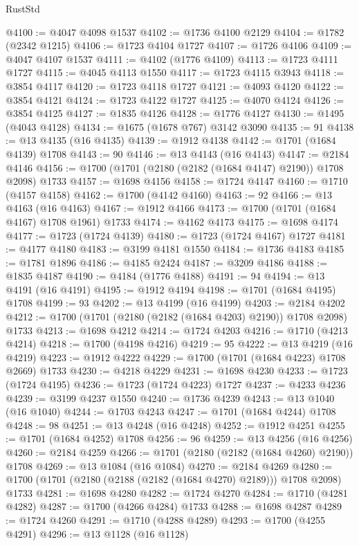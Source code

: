 \begin{lexlean}{RustStd}
\begin{coremodule}
@4100 := @4047 @4098 @1537
@4102 := @1736 @4100 @2129
@4104 := @1782 (@2342 @1215)
@4106 := @1723 @4104 @1727
@4107 := @1726 @4106
@4109 := @4047 @4107 @1537
@4111 := @4102 (@1776 @4109)
@4113 := @1723 @4111 @1727
@4115 := @4045 @4113 @1550
@4117 := @1723 @4115 @3943
@4118 := @3854 @4117
@4120 := @1723 @4118 @1727
@4121 := @4093 @4120
@4122 := @3854 @4121
@4124 := @1723 @4122 @1727
@4125 := @4070 @4124
@4126 := @3854 @4125
@4127 := @1835 @4126
@4128 := @1776 @4127
@4130 := @1495 (@4043 @4128)
@4134 := @1675 (@1678 @767) @3142 @3090
@4135 := 91
@4138 := @13 @4135 (@16 @4135)
@4139 := @1912 @4138
@4142 := @1701 (@1684 @4139) @1708
@4143 := 90
@4146 := @13 @4143 (@16 @4143)
@4147 := @2184 @4146
@4156 := @1700 (@1701 (@2180 (@2182 (@1684 @4147) @2190)) @1708 @2098) @1733
@4157 := @1698 @4156
@4158 := @1724 @4147
@4160 := @1710 (@4157 @4158)
@4162 := @1700 (@4142 @4160)
@4163 := 92
@4166 := @13 @4163 (@16 @4163)
@4167 := @1912 @4166
@4173 := @1700 (@1701 (@1684 @4167) @1708 @1961) @1733
@4174 := @4162 @4173
@4175 := @1698 @4174
@4177 := @1723 (@1724 @4139)
@4180 := @1723 (@1724 @4167) @1727
@4181 := @4177 @4180
@4183 := @3199 @4181 @1550
@4184 := @1736 @4183
@4185 := @1781 @1896
@4186 := @4185 @2424
@4187 := @3209 @4186
@4188 := @1835 @4187
@4190 := @4184 (@1776 @4188)
@4191 := 94
@4194 := @13 @4191 (@16 @4191)
@4195 := @1912 @4194
@4198 := @1701 (@1684 @4195) @1708
@4199 := 93
@4202 := @13 @4199 (@16 @4199)
@4203 := @2184 @4202
@4212 := @1700 (@1701 (@2180 (@2182 (@1684 @4203) @2190)) @1708 @2098) @1733
@4213 := @1698 @4212
@4214 := @1724 @4203
@4216 := @1710 (@4213 @4214)
@4218 := @1700 (@4198 @4216)
@4219 := 95
@4222 := @13 @4219 (@16 @4219)
@4223 := @1912 @4222
@4229 := @1700 (@1701 (@1684 @4223) @1708 @2669) @1733
@4230 := @4218 @4229
@4231 := @1698 @4230
@4233 := @1723 (@1724 @4195)
@4236 := @1723 (@1724 @4223) @1727
@4237 := @4233 @4236
@4239 := @3199 @4237 @1550
@4240 := @1736 @4239
@4243 := @13 @1040 (@16 @1040)
@4244 := @1703 @4243
@4247 := @1701 (@1684 @4244) @1708
@4248 := 98
@4251 := @13 @4248 (@16 @4248)
@4252 := @1912 @4251
@4255 := @1701 (@1684 @4252) @1708
@4256 := 96
@4259 := @13 @4256 (@16 @4256)
@4260 := @2184 @4259
@4266 := @1701 (@2180 (@2182 (@1684 @4260) @2190)) @1708
@4269 := @13 @1084 (@16 @1084)
@4270 := @2184 @4269
@4280 := @1700 (@1701 (@2180 (@2188 (@2182 (@1684 @4270) @2189))) @1708 @2098) @1733
@4281 := @1698 @4280
@4282 := @1724 @4270
@4284 := @1710 (@4281 @4282)
@4287 := @1700 (@4266 @4284) @1733
@4288 := @1698 @4287
@4289 := @1724 @4260
@4291 := @1710 (@4288 @4289)
@4293 := @1700 (@4255 @4291)
@4296 := @13 @1128 (@16 @1128)

\end{coremodule}
\end{lexlean}
